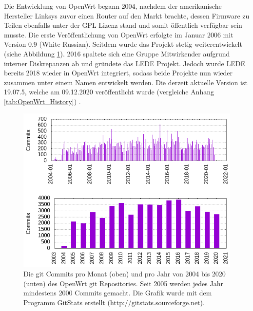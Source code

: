 \documentclass[a4paper]{book}
\begin{document}
\begin{large}
\begin{onehalfspace}
  \indent Die Entwicklung von OpenWrt begann 2004, nachdem der amerikanische Hersteller Linksys zuvor einen Router auf den Markt brachte, dessen Firmware zu Teilen ebenfalls unter der GPL Lizenz stand und somit öffentlich verfügbar sein musste. Die erste Veröffentlichung von OpenWrt erfolgte im Januar 2006 mit Version 0.9 (White Russian). Seitdem wurde das Projekt stetig weiterentwickelt (siehe Abbildung \ref{fig:OpenWrt Commits pro Monat}). 2016 spaltete sich eine Gruppe Mitwirkender aufgrund interner Diskrepanzen ab und gründete das LEDE Projekt. Jedoch wurde LEDE bereits 2018 wieder in OpenWrt integriert, sodass beide Projekte nun wieder zusammen unter einem Namen entwickelt werden. Die derzeit aktuelle Version ist 19.07.5, welche am 09.12.2020 veröffentlicht wurde (vergleiche Anhang \ref{tab:OpenWrt_History}) \cite{OpenWrtWebseite.13.12.2020}.\newline

\begin{figure}[ht]
\begin{center}
\includegraphics[scale=0.5]{images/commits_by_year_month.png} 
\caption{Die git Commits pro Monat (oben) und pro Jahr von 2004 bis 2020 (unten) des OpenWrt git Repositories. Seit 2005 werden jedes Jahr mindestens 2000 Commits gemacht. Die Grafik wurde mit dem Programm GitStats erstellt (http://gitstats.sourceforge.net).}
\label{fig:OpenWrt Commits pro Monat}
\end{center}
\end{figure}

\end{onehalfspace}


\end{large}
\end{document}
